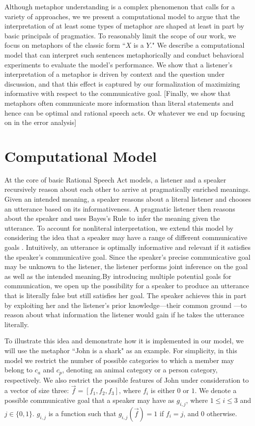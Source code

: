 \documentclass[10pt,letterpaper]{article}
\begin{document}
Although metaphor understanding is a complex phenomenon that calls for a variety of approaches, we we present a computational model to argue that the interpretation of at least some types of metaphor are shaped at least in part by basic principals of pragmatics. To reasonably limit the scope of our work, we focus on metaphors of the classic form ``$X$ is a $Y$." We describe a computational model that can interpret such sentences metaphorically and conduct behavioral experiments to evaluate the model's performance. We show that a listener's interpretation of a metaphor is driven by context and the question under discussion, and that this effect is captured by our formalization of maximizing informative with respect to the communicative goal. [Finally, we show that metaphors often communicate more information than literal statements and hence can be optimal and rational speech acts. Or whatever we end up focusing on in the error analysis]

\section{Computational Model}
At the core of basic Rational Speech Act models, a listener and a speaker recursively reason about each other to arrive at pragmatically enriched meanings. Given an intended meaning, a speaker reasons about a literal listener and chooses an utterance based on its informativeness. A pragmatic listener then reasons about the speaker and uses Bayes's Rule to infer the meaning given the utterance. To account for nonliteral interpretation, we extend this model by considering the idea that a speaker may have a range of different communicative goals \cite{}. Intuitively, an utterance is optimally informative and relevant if it satisfies the speaker's communicative goal. Since the speaker's precise communicative goal may be unknown to the listener, the listener performs joint inference on the goal as well as the intended meaning.By introducing multiple potential goals for communication, we open up the possibility for a speaker to produce an utterance that is literally false but still satisfies her goal. The speaker achieves this in part by exploiting her and the listener's prior knowledge---their common ground \cite{clark1996using}---to reason about what information the listener would gain if he takes the utterance literally. 

To illustrate this idea and demonstrate how it is implemented in our model, we will use the metaphor ``John is a shark" as an example. For simplicity, in this model we restrict the number of possible categories to which a member may belong to $c_a$ and $c_p$, denoting an animal category or a person category, respectively. We also restrict the possible features of John under consideration to a vector of size three: $\vec f = [f_1, f_2, f_3]$, where $f_i$ is either $0$ or $1$. We denote a possible communicative goal that a speaker may have as $g_{i,j}$, where $1 \leq i \leq 3$ and $j \in \{0,1\}$. $g_{i,j}$ is a function such that $g_{i,j} (\vec f) = 1$ if $f_i = j$, and $0$ otherwise. 
\end{document}
